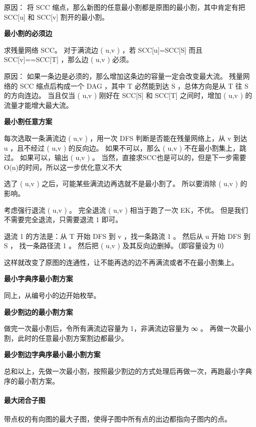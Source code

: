 \documentclass[a4paper,11pt]{article}
\begin{document}
     原因： 将 SCC 缩点，那么新图的任意最小割都是原图的最小割，其中肯定有把 SCC[u] 和 SCC[v] 割开的最小割。
     
     \textbf{最小割的必须边}
     
     求残量网络 SCC。 
     对于满流边 ( u,v ) ，若 SCC[u]=SCC[S] 而且 SCC[v]==SCC[T] ，那么边 ( u,v ) 必须。
     
     原因： 如果一条边是必须的，那么增加这条边的容量一定会改变最大流。 
     残量网络的 SCC 缩点后构成一个 DAG ，其中 T 必然能到达 S ，总体方向是从 T 往 S 的方向连边。 
     当且仅当 ( u,v ) 刚好在 SCC[S] 和 SCC[T] 之间时，增加 ( u,v ) 的流量才能增大最大流。
     
     \textbf{最小割任意方案}
     
     每次选取一条满流边 ( u,v ) ，用一次 DFS 判断是否能在残量网络上，从 v 到达 u ，且不经过 ( u,v ) 的反向边。 
     如果不可以，那么 ( u,v ) 不在最小割集上，跳过。 
     如果可以，输出 ( u,v ) 。 
     当然，直接求SCC也是可以的，但是下一步需要O(n)的时间，所以这一步优化意义不大
     
     选了 ( u,v ) 之后，可能某些满流边再选就不是最小割了。 
     所以要消除 ( u,v ) 的影响。
     
     考虑强行退流 ( u,v ) 。 
     完全退流 ( u,v ) 相当于跑了一次 EK，不优。 
     但是我们不需要完全退流，只需要退流 1 即可。
     
     退流 1 的方法是：从 T 开始 DFS 到 v ，找一条路流 1 。 
     然后从 u 开始 DFS 到 S ， 找一条路径流 1 。 
     然后把 ( u,v ) 及其反向边删掉。（即容量设为 0）
     
     这样就改变了原图的连通性，让不能再选的边不再满流或者不在最小割集上。
     
     \textbf{最小字典序最小割方案}
     
     同上，从编号小的边开始枚举。
     
     \textbf{最少割边的最小割方案}
     
     做完一次最小割后，令所有满流边容量为 1，非满流边容量为 ∞ 。
     再做一次最小割，此时的任意最小割方案割边都最少。
     
     \textbf{最少割边字典序最小最小割方案}
     
     总和以上，先做一次最小割，按照最少割边的方式处理后再做一次，再跑最小字典序的最小割方案。
    
	\paragraph{最大闭合子图}
	带点权的有向图的最大子图，使得子图中所有点的出边都指向子图内的点。
	
\end{document}
